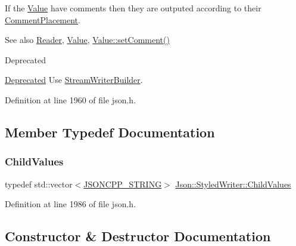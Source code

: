 If the \hyperlink{class_json_1_1_value}{Value} have comments then they are outputed according to their \hyperlink{namespace_json_a4fc417c23905b2ae9e2c47d197a45351}{Comment\+Placement}.

\begin{DoxySeeAlso}{See also}
\hyperlink{class_json_1_1_reader}{Reader}, \hyperlink{class_json_1_1_value}{Value}, \hyperlink{class_json_1_1_value_a29f3a30f7e5d3af6f38d57999bf5b480}{Value\+::set\+Comment()} 
\end{DoxySeeAlso}
\begin{DoxyRefDesc}{Deprecated}
\item[\hyperlink{deprecated__deprecated000009}{Deprecated}]Use \hyperlink{class_json_1_1_stream_writer_builder}{Stream\+Writer\+Builder}. \end{DoxyRefDesc}


Definition at line 1960 of file json.\+h.



\subsection{Member Typedef Documentation}
\mbox{\label{class_json_1_1_styled_writer_a798fcefa41730de612a5cf7e73003e8a}} 
\subsubsection{\texorpdfstring{Child\+Values}{ChildValues}}
{\footnotesize\ttfamily typedef std\+::vector$<$\hyperlink{json_8h_a1e723f95759de062585bc4a8fd3fa4be}{J\+S\+O\+N\+C\+P\+P\+\_\+\+S\+T\+R\+I\+NG}$>$ \hyperlink{class_json_1_1_styled_writer_a798fcefa41730de612a5cf7e73003e8a}{Json\+::\+Styled\+Writer\+::\+Child\+Values}\hspace{0.3cm}{\ttfamily [private]}}



Definition at line 1986 of file json.\+h.



\subsection{Constructor \& Destructor Documentation}
\mbox{\label{class_json_1_1_styled_writer_a1f1b5f922a6a0ef0e56c6dd2f6170192}} 
